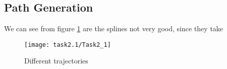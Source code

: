 \subsection{Path Generation}\label{sec:prob2.1}
We can see from figure \ref{fig:task2_1} are the splines not very good, since they take 
\begin{figure}[h]
    \centering
     \texttt{[image: task2.1/Task2\_1]}
    \caption{Different trajectories}
    \label{fig:task2_1}
\end{figure}